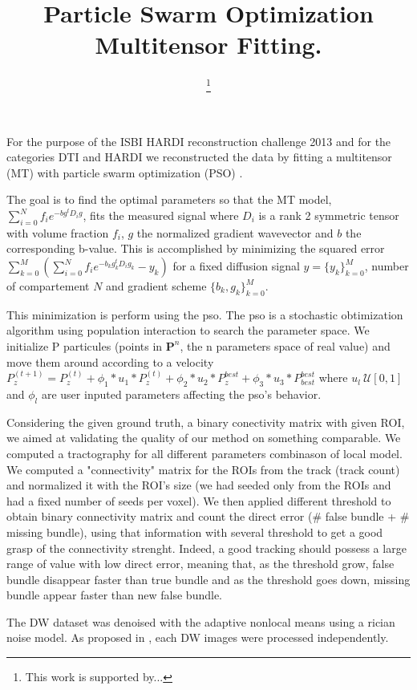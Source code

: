 \documentclass[9pt,conference,a4paper]{IEEEtran}
\title{Particle Swarm Optimization Multitensor Fitting.}
\author{
	\IEEEauthorblockN{
		Michael Paquette\IEEEauthorrefmark{1},
		Eleftherios Garyfallidis\IEEEauthorrefmark{1},
		Samuel St-Jean\IEEEauthorrefmark{1},
		Pierrick Coup\'e\IEEEauthorrefmark{2},
		Maxime Descoteaux\IEEEauthorrefmark{1}
	}

	\IEEEauthorblockA{\IEEEauthorrefmark{1} Universit\'e de Sherbrooke, Sherbrooke, Canada}
	\IEEEauthorblockA{\IEEEauthorrefmark{2} McGill University, Montreal, Canada}

	\thanks{This work is supported by...}
}
\begin{document}
\maketitle

For the purpose of the ISBI HARDI reconstruction challenge 2013 and for the categories DTI and HARDI we reconstructed the data by fitting a multitensor (MT) with particle swarm optimization (PSO) \cite{?pso?}. 

The goal is to find the optimal parameters so that the MT model, $\sum_{i=0}^N f_i e^{-b g^t D_i g}$, fits the measured signal where $D_i$ is a rank 2 symmetric tensor with volume fraction $f_i$, $g$ the normalized gradient wavevector and $b$ the corresponding b-value. This is accomplished by minimizing the squared error $\sum_{k=0}^M \left( \sum_{i=0}^N f_i e^{-b_k g_k^t D_i g_k} - y_k \right) $ for a fixed diffusion signal $y = \{y_k\}_{k=0}^M$, number of compartement $N$ and gradient scheme $ \{b_k, g_k\}_{k=0}^M$.

This minimization is perform using the pso. The pso is a stochastic obtimization algorithm using population interaction to search the parameter space. We initialize P particules (points in $\mathbf{P}^n$, the n parameters space of real value) and move them around according to a velocity $P_z^{(t+1)} = P_z^{(t)} + \phi_1 * u_1 * P_z^{(t)} + \phi_2 * u_2 * P_z^{best} + \phi_3 * u_3 * P_{best}^{best}$ where $u_l ~ \mathcal{U}[0,1]$ and $\phi_l$ are user inputed parameters affecting the pso's behavior.

Considering the given ground truth, a binary conectivity matrix with given ROI, we aimed at validating the quality of our method on something comparable. We computed a tractography for all different parameters combinason of local model. We computed a "connectivity" matrix for the ROIs from the track (track count) and normalized it with the ROI's size (we had seeded only from the ROIs and had a fixed number of seeds per voxel). We then  applied different threshold to obtain binary connectivity matrix and count the direct error (# false bundle + # missing bundle), using that information with several threshold to get a good grasp of the connectivity strenght. Indeed, a good tracking should possess a large range of value with low direct error, meaning that, as the threshold grow, false bundle disappear faster than true bundle and as the threshold goes down, missing bundle appear faster than new false bundle.

The DW dataset was denoised with the adaptive nonlocal means \cite{manjon-coupe:10}
using a rician noise model. As proposed in \cite{descoteaux-wiest-daessle-etal:08}, each DW images were processed independently.
\end{document}
